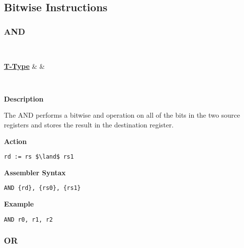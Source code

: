 \subsection{Bitwise Instructions}

\subsubsection{AND }\label{sec:AND}

\vspace{3ex}

\begin{center}
	\begin{bytefield}[leftcurly=., leftcurlyspace=0pt]{32}
		 \\
		\begin{leftwordgroup}{\hyperref[sec:t-type]{\textbf{T-Type}}}
			 & 
			 &
		\end{leftwordgroup}\\
	\end{bytefield}
\end{center}

\textbf{Description}

The AND performs a bitwise and operation on all of the bits in the two source registers and stores the result in the destination register.

\vspace{3ex}

\textbf{Action}
\begin{lstlisting}[frame=single]
	rd := rs $\land$ rs1
\end{lstlisting}

\vspace{3ex}

\textbf{Assembler Syntax}
\begin{lstlisting}[frame=single]
	AND {rd}, {rs0}, {rs1}
\end{lstlisting}

\vspace{3ex}

\textbf{Example}
\begin{lstlisting}[frame=single]
	AND r0, r1, r2
\end{lstlisting}

\subsubsection{OR }\label{sec:OR}
 
